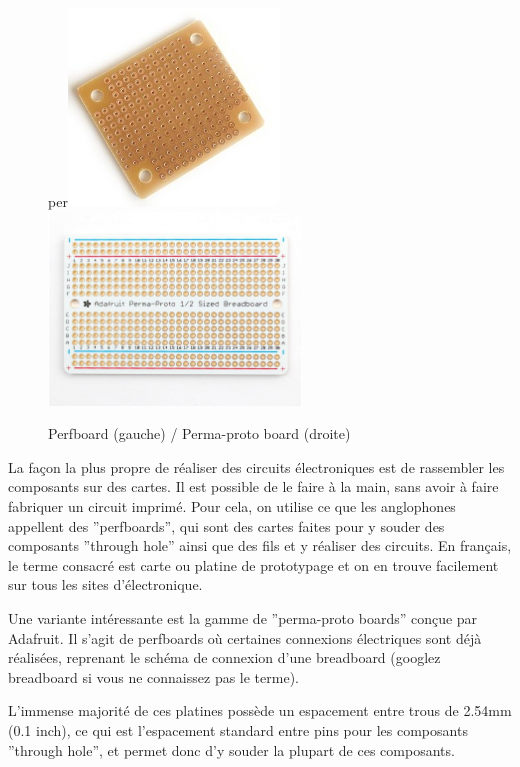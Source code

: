 \documentclass[a4paper, 11pt]{report}
\begin{document}
\begin{figure}[h]
\caption{Perfboard (gauche) / Perma-proto board (droite)}

per\centering{}\includegraphics[width=0.5\textwidth]{images/perfboard}\includegraphics[width=0.6\textwidth]{images/perma_proto_board.jpg}
\end{figure}

La façon la plus propre de réaliser des circuits électroniques est
de rassembler les composants sur des cartes. Il est possible de le
faire à la main, sans avoir à faire fabriquer un circuit imprimé.
Pour cela, on utilise ce que les anglophones appellent des ''perfboards'',
qui sont des cartes faites pour y souder des composants ''through
hole'' ainsi que des fils et y réaliser des circuits. En français,
le terme consacré est carte ou platine de prototypage et on en trouve
facilement sur tous les sites d'électronique.

Une variante intéressante est la gamme de ''perma-proto boards''
conçue par Adafruit. Il s'agit de perfboards où certaines connexions
électriques sont déjà réalisées, reprenant le schéma de connexion
d'une breadboard (googlez breadboard si vous ne connaissez pas le
terme).

L'immense majorité de ces platines possède un espacement entre trous
de 2.54mm (0.1 inch), ce qui est l'espacement standard entre pins
pour les composants ''through hole'', et permet donc d'y souder
la plupart de ces composants.
\end{document}

